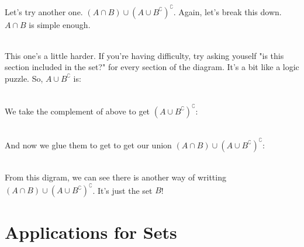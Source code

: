 \myexample
{
	Let's try another one. $(A \cap B) \cup (A \cup B^\complement)^\complement$. Again, let's break this down. $A \cap B$ is simple enough.\\
	\begin{venndiagram2sets}[shade=skyblue,labelNotAB={$\mathcal{U}$}]
		\fillACapB
	\end{venndiagram2sets}\\
	This one's a little harder. If you're having difficulty, try asking youself "is this section included in the set?" for every section of the diagram. It's a bit like a logic puzzle. So, $A \cup B^\complement$ is:\\
	\begin{venndiagram2sets}[shade=skyblue,labelNotAB={$\mathcal{U}$}]
		\fillA \fillNotAorB
	\end{venndiagram2sets}\\
	We take the complement of above to get $(A \cup B^\complement)^\complement$:\\
	\begin{venndiagram2sets}[shade=skyblue,labelNotAB={$\mathcal{U}$}]
		\fillOnlyB
	\end{venndiagram2sets}\\
	And now we glue them to get to get our union $(A \cap B) \cup (A \cup B^\complement)^\complement$:\\
	\begin{venndiagram2sets}[shade=skyblue,labelNotAB={$\mathcal{U}$}]
		\fillB
	\end{venndiagram2sets}\\
	From this digram, we can see there is another way of writting $(A \cap B) \cup (A \cup B^\complement)^\complement$. It's just the set $B$!
}

\section{Applications for Sets}

